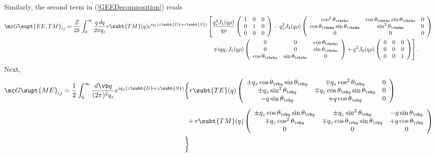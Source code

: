 \documentclass[letterpaper]{article}
\begin{document}
Similarly, the second term in (\ref{GEEDecomposition}) reads
\begin{align*}
\mc G\supt{EE,TM}_{ij}
=
\frac{Z}{2k} \int_0^\infty \frac{q \, dq}{2\pi q_z}
     r\subt{TM}(q)e^{iq_z(z\subt{D}+z\subt{S})}
&    \left[
     \frac{q_z^2 J_1(q\rho)}{q\rho}
     \left(\begin{array}{ccc}
      1 & 0 & 0 \\ 0 & 1 & 0 \\ 0 & 0 & 0 
     \end{array}\right)
     -q_z^2 J_2(q\rho)
     \left(
     \begin{array}{ccc} 
     \cos^2\theta_{\vbrho} & \cos\theta_{\vbrho} \sin\theta_{\vbrho} & 0 \\
     \cos\theta_{\vbrho} \sin\theta_{\vbrho} & \sin^2\theta_{\vbrho} & 0 \\
     0 & 0 & 0 
     \end{array}\right)
     \right.
\\
&\hspace{0.1in}
     \left.
     \mp i q q_z J_1(q\rho)
     \left(\begin{array}{ccc}
      0 & 0 & \cos\theta_{\vbrho} \\
      0 & 0 & \sin\theta_{\vbrho} \\
      \cos\theta_{\vbrho} & \sin\theta_{\vbrho} & 0
     \end{array}\right)
     +
      q^2 J_0(q\rho)
     \left(\begin{array}{ccc}
      0 & 0 & 0 \\ 0 & 0 & 0 \\ 0 & 0 & 1
     \end{array}\right)
     \right].
\end{align*}
Next,
\begin{align*}
\mc G\supt{ME}_{ij}
=
\frac{1}{2} \int_0^\infty \frac{d\vb q}{(2\pi)^2 q_z}
 e^{iq_z(z\subt{D}+z\subt{S})}
 &\bigg\{
     r\subt{TE}(q)
     \left(\begin{array}{ccc}
     \pm q_z \cos\theta_{\vb q} \sin\theta_{\vb q}
   & \mp q_z \cos^2\theta_{\vb q} 
   & 0
\\
     \pm q_z \sin^2\theta_{\vb q}
   & \mp q_z \cos\theta_{\vb q}\sin\theta_{\vb q}
   & 0
\\
     -q\sin\theta_{\vb q}
   &
     +q\cos\theta_{\vb q}
   &
      0
     \end{array}\right)
\\[5pt]
&\,\,+
     r\subt{TM}(q)
     \left(\begin{array}{ccc}
     \pm q_z \cos\theta_{\vb q} \sin\theta_{\vb q}
   & \pm q_z \sin^2\theta_{\vb q} 
   & -q\sin\theta_{\vb q}
\\
     \mp q_z \cos^2\theta_{\vb q}
   & \mp q_z \cos\theta_{\vb q}\sin\theta_{\vb q}
   & +q\cos\theta_{\vb q}
\\
     0
   &
     0
   &
     0
     \end{array}\right)
\\
 &\bigg\}
\end{align*}
\end{document}
